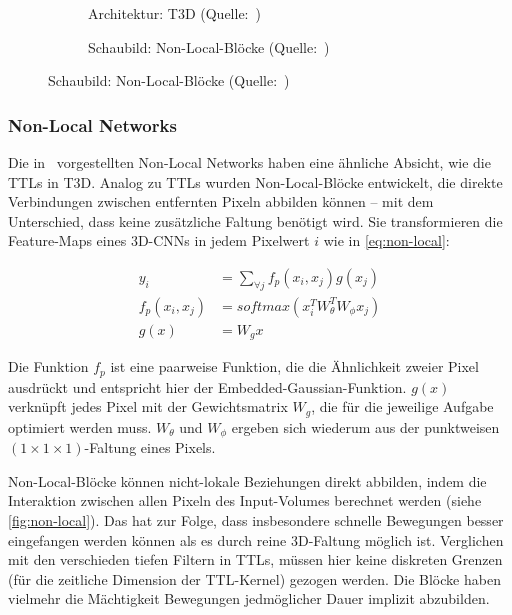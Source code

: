 \begin{figure}
    \centering
    \begin{subfigure}[b]{.5\textwidth}
        \centering
        \caption{Architektur: T3D (Quelle:~\cite{Diba17})}
        \label{fig:t3d}
    \end{subfigure}%
    \begin{subfigure}[b]{.5\textwidth}
        \centering
        \caption{Schaubild: Non-Local-Blöcke (Quelle:~\cite{Wang18})}
        \label{fig:non-local}
    \end{subfigure}
\end{figure}

\subsubsection*{Non-Local Networks}

Die in~\cite{Wang18} vorgestellten Non-Local Networks haben eine ähnliche Absicht, wie die TTLs in T3D.
Analog zu TTLs wurden Non-Local-Blöcke entwickelt, die direkte Verbindungen zwischen entfernten Pixeln abbilden können -- mit dem Unterschied, dass keine zusätzliche Faltung benötigt wird.
Sie transformieren die Feature-Maps eines 3D-CNNs in jedem Pixelwert $i$ wie in \autoref{eq:non-local}:

\begin{equation}
\label{eq:non-local}
\begin{split}
    y_i             & = \sum_{\forall j} f_p(x_i, x_j) g(x_j) \\
    f_p(x_i, x_j)   & = softmax(x_i^T W^T_\theta W_\phi x_j) \\
    g(x)            & = W_g x
\end{split}
\end{equation}

Die Funktion $f_p$ ist eine paarweise Funktion, die die Ähnlichkeit zweier Pixel ausdrückt und entspricht hier der Embedded-Gaussian-Funktion.
$g(x)$ verknüpft jedes Pixel mit der Gewichtsmatrix $W_g$, die für die jeweilige Aufgabe optimiert werden muss.
$W_\theta$ und $W_\phi$ ergeben sich wiederum aus der punktweisen $(1 \times 1 \times 1)$-Faltung eines Pixels.

Non-Local-Blöcke können nicht-lokale Beziehungen direkt abbilden, indem die Interaktion zwischen allen Pixeln des Input-Volumes berechnet werden (siehe \autoref{fig:non-local}).
Das hat zur Folge, dass insbesondere schnelle Bewegungen besser eingefangen werden können als es durch reine 3D-Faltung möglich ist.
Verglichen mit den verschieden tiefen Filtern in TTLs, müssen hier keine diskreten Grenzen (für die zeitliche Dimension der TTL-Kernel) gezogen werden.
Die Blöcke haben vielmehr die Mächtigkeit Bewegungen jedmöglicher Dauer implizit abzubilden.

